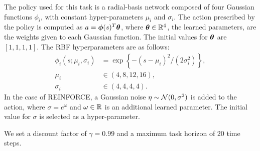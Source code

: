 The policy used for this task is a radial-basis network composed of four Gaussian functions $\phi_i$, with constant hyper-parameters $\mu_i$ and $\sigma_i$. The action prescribed by the policy is computed as $a = \boldsymbol{\phi}(s)^T\boldsymbol{\theta}$, where $\boldsymbol{\theta}\in\mathbb{R}^4$, the learned parameters, are the weights given to each Gaussian function. The initial values for $\boldsymbol{\theta}$ are $[1, 1, 1, 1]$. The RBF hyperparameters are as follows: 
\begin{align}
\phi_i(s; \mu_i, \sigma_i) &= \exp\left\{-{(s -\mu_i)^2}\big/{(2\sigma_i^2)}\right\}, \nonumber \\
\mu_i &\in (4, 8, 12, 16), \nonumber \\
\sigma_i &\in(4, 4, 4, 4). \nonumber
\end{align}
In the case of REINFORCE, a Gaussian noise $\eta\sim\mathcal{N}(0,\sigma^2)$ is added to the action, where $\sigma=e^{\omega}$ and $\omega\in\mathbb{R}$ is an additional learned parameter. The initial value for $\sigma$ is selected as a hyper-parameter.

We set a discount factor of $\gamma=0.99$ and a maximum task horizon of $20$ time steps.

